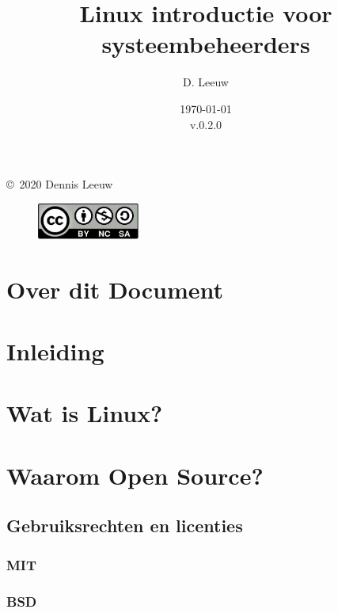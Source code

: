 \documentclass[a4paper,12pt,twoside,openright,titlepage]{book}
\author{D. Leeuw}
\title{Linux introductie voor systeembeheerders}
\date{\today\\v.0.2.0}
\begin{document}

\maketitle

\copyright\ 2020 Dennis Leeuw\\

\begin{figure}
\includegraphics[width=0.3\textwidth]{linuxreader-img001.png}
\end{figure}

\bigskip




\frontmatter
\chapter{Over dit Document}



\tableofcontents

\mainmatter
\chapter{Inleiding}


\chapter{Wat is Linux?}


\chapter{Waarom Open Source?}

\section{Gebruiksrechten en licenties}

\subsection{MIT}

\subsection{BSD}

\end{document}
